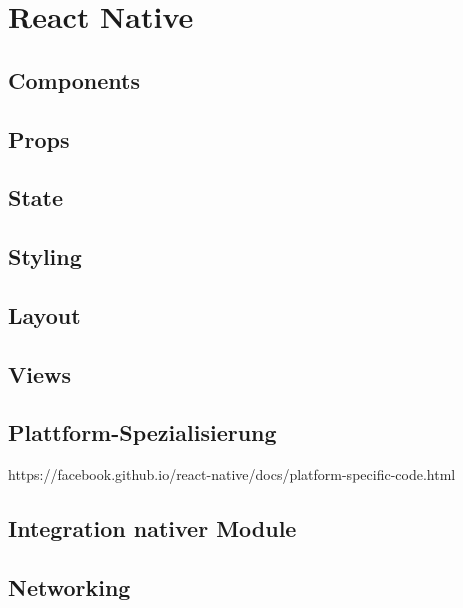 \section{React Native}

\subsection{Components}

\subsection{Props}

\subsection{State}

\subsection{Styling}

\subsection{Layout}

\subsection{Views}

\subsection{Plattform-Spezialisierung}
https://facebook.github.io/react-native/docs/platform-specific-code.html

\subsection{Integration nativer Module}

\subsection{Networking}

